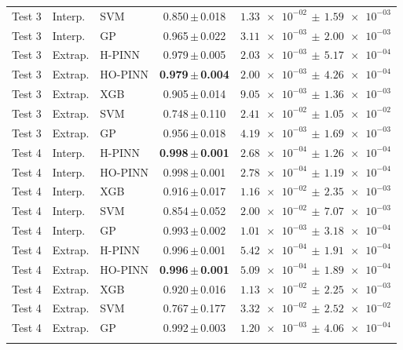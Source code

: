 \begin{longtable}{lllcc}
Test 3 & Interp. & SVM & 0.850\,$\pm$\,0.018 & $\num{1.33e-02}\,\pm\,\num{1.59e-03}$ \\
Test 3 & Interp. & GP & 0.965\,$\pm$\,0.022 & $\num{3.11e-03}\,\pm\,\num{2.00e-03}$ \\
\addlinespace[2pt]
Test 3 & Extrap. & H-PINN & 0.979\,$\pm$\,0.005 & $\num{2.03e-03}\,\pm\,\num{5.17e-04}$ \\
Test 3 & Extrap. & HO-PINN & \textbf{0.979\,$\pm$\,0.004} & \textbf{$\num{2.00e-03}\,\pm\,\num{4.26e-04}$} \\
Test 3 & Extrap. & XGB & 0.905\,$\pm$\,0.014 & $\num{9.05e-03}\,\pm\,\num{1.36e-03}$ \\
Test 3 & Extrap. & SVM & 0.748\,$\pm$\,0.110 & $\num{2.41e-02}\,\pm\,\num{1.05e-02}$ \\
Test 3 & Extrap. & GP & 0.956\,$\pm$\,0.018 & $\num{4.19e-03}\,\pm\,\num{1.69e-03}$ \\
\addlinespace[2pt]
Test 4 & Interp. & H-PINN & \textbf{0.998\,$\pm$\,0.001} & \textbf{$\num{2.68e-04}\,\pm\,\num{1.26e-04}$} \\
Test 4 & Interp. & HO-PINN & 0.998\,$\pm$\,0.001 & $\num{2.78e-04}\,\pm\,\num{1.19e-04}$ \\
Test 4 & Interp. & XGB & 0.916\,$\pm$\,0.017 & $\num{1.16e-02}\,\pm\,\num{2.35e-03}$ \\
Test 4 & Interp. & SVM & 0.854\,$\pm$\,0.052 & $\num{2.00e-02}\,\pm\,\num{7.07e-03}$ \\
Test 4 & Interp. & GP & 0.993\,$\pm$\,0.002 & $\num{1.01e-03}\,\pm\,\num{3.18e-04}$ \\
\addlinespace[2pt]
Test 4 & Extrap. & H-PINN & 0.996\,$\pm$\,0.001 & $\num{5.42e-04}\,\pm\,\num{1.91e-04}$ \\
Test 4 & Extrap. & HO-PINN & \textbf{0.996\,$\pm$\,0.001} & \textbf{$\num{5.09e-04}\,\pm\,\num{1.89e-04}$} \\
Test 4 & Extrap. & XGB & 0.920\,$\pm$\,0.016 & $\num{1.13e-02}\,\pm\,\num{2.25e-03}$ \\
Test 4 & Extrap. & SVM & 0.767\,$\pm$\,0.177 & $\num{3.32e-02}\,\pm\,\num{2.52e-02}$ \\
Test 4 & Extrap. & GP & 0.992\,$\pm$\,0.003 & $\num{1.20e-03}\,\pm\,\num{4.06e-04}$ \\
\addlinespace[2pt]
\end{longtable}
\endgroup
